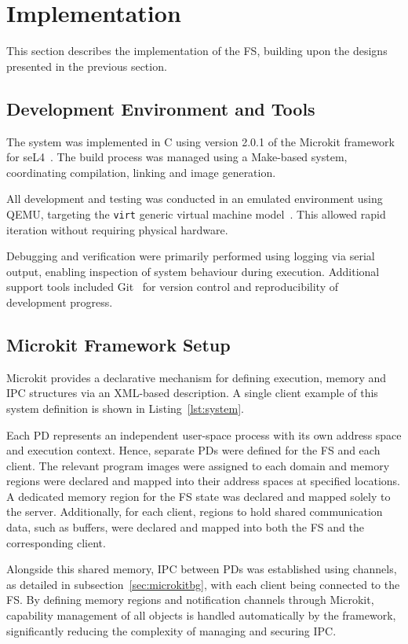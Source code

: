 \chapter{Implementation}
\label{cha:implementation}
This section describes the implementation of the FS, building upon the designs presented in the previous section. 

\section{Development Environment and Tools}

The system was implemented in C using version 2.0.1 of the Microkit framework for seL4~\cite{microkit_2_0_1}. The build process was managed using a Make-based system, coordinating compilation, linking and image generation.

All development and testing was conducted in an emulated environment using QEMU, targeting the \texttt{virt} generic virtual machine model~\cite{qemu}. This allowed rapid iteration without requiring physical hardware.

Debugging and verification were primarily performed using logging via serial output, enabling inspection of system behaviour during execution. Additional support tools included Git~\cite{git} for version control and reproducibility of development progress.

\section{Microkit Framework Setup}

Microkit provides a declarative mechanism for defining execution, memory and IPC structures via an XML-based description. A single client example of this system definition is shown in Listing~\ref{lst:system}.

Each PD represents an independent user-space process with its own address space and execution context. Hence, separate PDs were defined for the FS and each client. The relevant program images were assigned to each domain and memory regions were declared and mapped into their address spaces at specified locations. A dedicated memory region for the FS state was declared and mapped solely to the server. Additionally, for each client, regions to hold shared communication data, such as buffers, were declared and mapped into both the FS and the corresponding client.

Alongside this shared memory, IPC between PDs was established using channels, as detailed in subsection~\ref{sec:microkitbg}, with each client being connected to the FS. By defining memory regions and notification channels through Microkit, capability management of all objects is handled automatically by the framework, significantly reducing the complexity of managing and securing IPC. 

